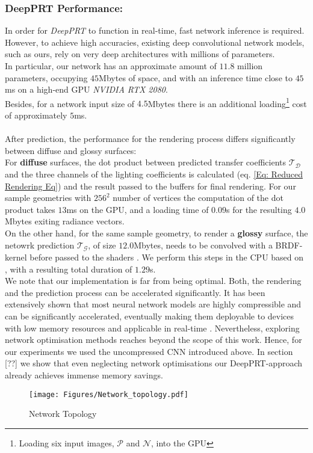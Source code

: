 \subsubsection*{DeepPRT Performance: \\}
In order for \textit{DeepPRT} to function in real-time, fast network inference is required. However, to achieve high accuracies, existing deep convolutional network models, such as ours, rely on very deep architectures with millions of parameters. 
\\
In particular, our network has an approximate amount of $11.8$ million parameters, occupying $45$Mbytes of space, and with an inference time close to $45$ms on a high-end GPU \textit{NVIDIA RTX 2080}. \\
Besides, for a network input size of $4.5$Mbytes there is an additional loading\footnote{Loading six input images, $\mathcal{P}$ and $\mathcal{N}$, into the GPU} cost of approximately $5$ms.  
\\
\\
After prediction, the performance for the rendering process differs significantly between diffuse and glossy surfaces:
\\ 
For \textbf{diffuse} surfaces, the dot product between predicted transfer coefficients $\mathcal{T_D}$ and the three channels of the lighting coefficients is calculated (eq. \ref{Eq: Reduced Rendering Eq}) and the result passed to the buffers for final rendering.  For our sample geometries with $256^2$ number of vertices the computation of the dot product takes $13$ms on the GPU, and a loading time of $0.09$s for the resulting $4.0$Mbytes exiting radiance vectors.
\\ 
On the other hand, for the same sample geometry, to render a \textbf{glossy} surface, the netowrk prediction $\mathcal{T_G}$, of size $12.0$Mbytes, needs to be convolved with a BRDF-kernel before passed to the shaders \cite{sloan2002precomputed}.  We perform this steps in the CPU based on \cite{ BRDF_kernel}, with a resulting total duration of $1.29$s. 
\\
We note that our implementation is far from being optimal.  Both, the rendering and the prediction process can be accelerated significantly. It has been extensively shown that most neural network models are highly compressible and can be significantly accelerated, eventually making them deployable to devices with low memory resources and applicable in real-time \cite{Deep_Compression, Survey_NN_Compression}.
Nevertheless, exploring network optimisation methods reaches beyond the scope of this work. Hence, for our experiments we used the uncompressed CNN introduced above. In section [??] we show that even neglecting network optimisations our DeepPRT-approach already achieves immense memory savings. 
\begin{figure*}[t]
  \centering
    \texttt{[image: Figures/Network\_topology.pdf]}
     \caption{Network Topology}
     \label{Fig: NetworkTopology}
\end{figure*}

  


